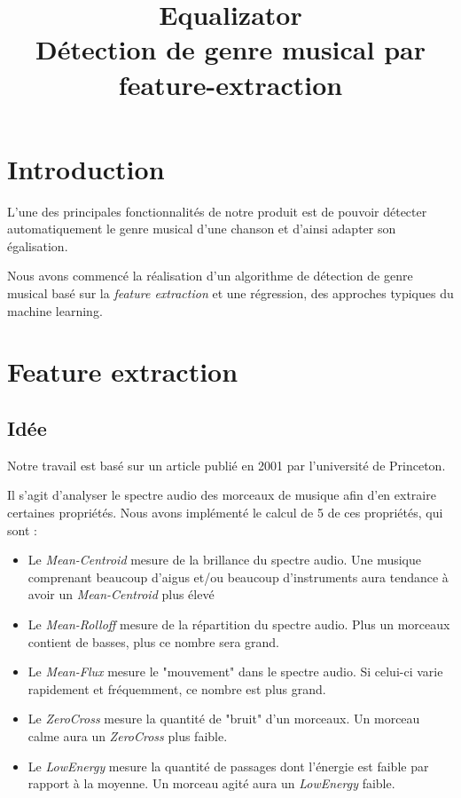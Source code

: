 \documentclass[a4paper]{article}
\title{Equalizator \\ Détection de genre musical par feature-extraction}
\author{}
\begin{document}
\maketitle

\tableofcontents

\newpage

\section{Introduction}

L'une des principales fonctionnalités de notre produit est de pouvoir détecter automatiquement le genre musical d'une chanson
et d'ainsi adapter son égalisation.

Nous avons commencé la réalisation d'un algorithme de détection de genre musical basé sur la \emph{feature extraction} et une régression, des approches typiques du machine learning.

\section{Feature extraction}

\subsection{Idée}

Notre travail est basé sur un article publié en 2001 par l'université de Princeton.

Il s'agit d'analyser le spectre audio des morceaux de musique afin d'en extraire certaines propriétés. Nous avons implémenté le calcul de 5 de ces propriétés, qui sont :

\begin{itemize}

\item Le \emph{Mean-Centroid} mesure de la brillance du spectre audio. Une musique comprenant beaucoup d'aigus et/ou beaucoup d'instruments aura tendance à avoir un \emph{Mean-Centroid} plus élevé

\item Le \emph{Mean-Rolloff} mesure de la répartition du spectre audio. Plus un morceaux contient de basses, plus ce nombre sera grand.

\item Le \emph{Mean-Flux} mesure le "mouvement" dans le spectre audio. Si celui-ci varie rapidement et fréquemment, ce nombre est plus grand.

\item Le \emph{ZeroCross} mesure la quantité de "bruit" d'un morceaux. Un morceau calme aura un \emph{ZeroCross} plus faible.

\item Le \emph{LowEnergy} mesure la quantité de passages dont l'énergie est faible par rapport à la moyenne. Un morceau agité aura un \emph{LowEnergy} faible.


\end{itemize}
\end{document}

